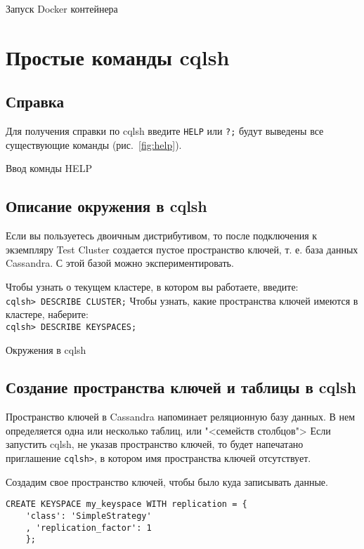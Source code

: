 \begin{image}
	\caption{Запуск Docker контейнера}
	\label{fig:docker}
\end{image}

\section{Простые команды cqlsh}
\subsection{Справка}

Для получения справки по cqlsh введите \verb|HELP| или \verb|?;|
будут выведены все существующие команды (рис.~\ref{fig:help}).

\begin{image}
	\caption{Ввод комнды HELP}
	\label{fig:help}
\end{image}

\subsection{Описание окружения в cqlsh}

Если вы пользуетесь двоичным дистрибутивом, то после подключения
к экземпляру Test Cluster создается пустое пространство ключей, т. е. база
данных Cassandra. С этой базой можно экспериментировать.\par
Чтобы узнать о текущем кластере, в котором вы работаете, введите:\\
\verb|cqlsh> DESCRIBE CLUSTER;|
Чтобы узнать, какие пространства ключей имеются в кластере, наберите:\\
\verb|cqlsh> DESCRIBE KEYSPACES;|

\begin{image}
	\caption{Окружения в cqlsh}
	\label{fig:keyspaces}
\end{image}

\subsection{Создание пространства ключей и таблицы в cqlsh}

Пространство ключей в Cassandra напоминает реляционную базу данных. В
нем определяется одна или несколько таблиц, или "<семейств столбцов"> Если
запустить cqlsh, не указав пространство ключей, то будет напечатано
приглашение \texttt{cqlsh>}, в котором имя пространства ключей отсутствует.\par
Создадим свое пространство ключей, чтобы было куда записывать данные.
\begin{verbatim}
CREATE KEYSPACE my_keyspace WITH replication = {
	'class': 'SimpleStrategy'
	, 'replication_factor': 1
	};
\end{verbatim}

